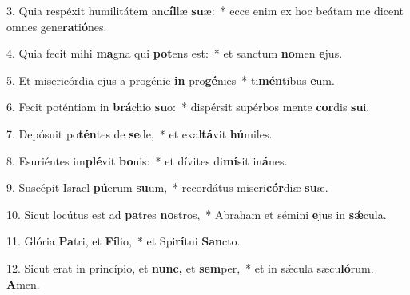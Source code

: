 \item 3. Quia respéxit humilitátem an\textbf{cíl}læ \textbf{su}æ:~* ecce enim ex hoc beátam me dicent omnes gene\textbf{ra}ti\textbf{ó}nes.

\item 4. Quia fecit mihi \textbf{ma}gna qui \textbf{pot}ens est:~* et sanctum \textbf{no}men \textbf{e}jus.

\item 5. Et misericórdia ejus a progénie \textbf{in} pro\textbf{gé}nies~* ti\textbf{mén}tibus \textbf{e}um.

\item 6. Fecit poténtiam in \textbf{brá}chio \textbf{su}o:~* dispérsit supérbos mente \textbf{cor}dis \textbf{su}i.

\item 7. Depósuit po\textbf{tén}tes de \textbf{se}de,~* et exal\textbf{tá}vit \textbf{hú}miles.

\item 8. Esuriéntes im\textbf{plé}vit \textbf{bo}nis:~* et dívites di\textbf{mí}sit in\textbf{á}nes.

\item 9. Suscépit Israel \textbf{pú}erum \textbf{su}um,~* recordátus miseri\textbf{cór}diæ \textbf{su}æ.

\item 10. Sicut locútus est ad \textbf{pa}tres \textbf{no}stros,~* Abraham et sémini \textbf{e}jus in \textbf{sǽ}cula.

\item 11. Glória \textbf{Pa}tri, et \textbf{Fí}lio,~* et Spi\textbf{rí}tui \textbf{San}cto.

\item 12. Sicut erat in princípio, et \textbf{nunc,} et \textbf{sem}per,~* et in sǽcula sæcu\textbf{ló}rum. \textbf{A}men.
